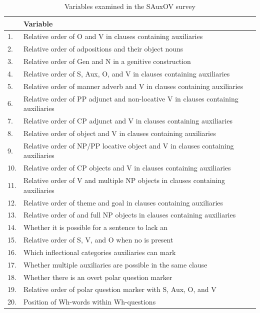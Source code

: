 \documentclass[output=paper]{LSP/langsci}
\begin{document}
\begin{table}
\caption{Variables examined in the SAuxOV survey} \label{tab:sande:variables} 
\begin{small}
\begin{tabular}{ll}
\lsptoprule
	 & \textbf{Variable}\\
	 \hline
	 1. & Relative order of O and V in clauses containing auxiliaries\\
	 2. & Relative order of adpositions and their object nouns\\
	 3. & Relative order of Gen and N in a genitive construction\\
	 4. & Relative order of S, Aux, O, and V in clauses containing auxiliaries\\
	 5. & Relative order of manner adverb and V in clauses containing auxiliaries\\
	 6. & Relative order of PP adjunct and non-locative V in clauses containing auxiliaries\\
	 7. & Relative order of CP adjunct and V in clauses containing auxiliaries\\
	 8. & Relative order of object \isi{pronoun} and V in clauses containing auxiliaries\\
	 9. & Relative order of NP/PP locative object and V in clauses containing auxiliaries\\
	 10. & Relative order of CP objects and V in clauses containing auxiliaries\\
	 11. & Relative order of V and multiple NP objects in clauses containing auxiliaries\\
	 12. & Relative order of theme and goal in clauses containing auxiliaries\\
	 13. & Relative order of \isi{pronoun} and full NP objects in clauses containing auxiliaries\\
	 14. & Whether it is possible for a sentence to lack an \isi{auxiliary}\\
	 15. & Relative order of S, V, and O when no \isi{auxiliary} is present\\
	 16. & Which inflectional categories auxiliaries can mark\\
	 17. & Whether multiple auxiliaries are possible in the same clause\\
	 18. & Whether there is an overt polar question marker\\
	 19. & Relative order of polar question marker with S, Aux, O, and V\\
	 20. & Position of Wh-words within Wh-questions\\

\end{tabular}
\end{small}
\end{table}
\end{document}
